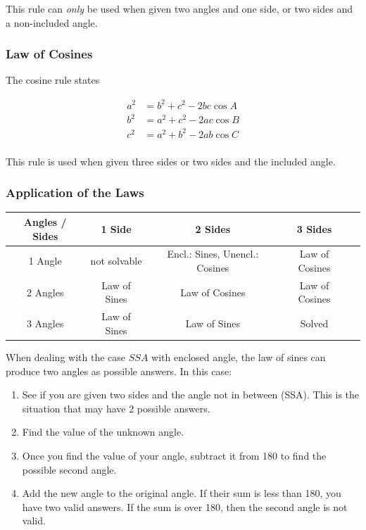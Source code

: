 This rule can \emph{only} be used when given two angles and one side, or two sides and a non-included angle.

\subsubsection{Law of Cosines}

The cosine rule states

\begin{align}
	a^{2} & =b^{2}+c^{2}-2 b c \cos A \\
	b^{2} & =a^{2}+c^{2}-2 a c \cos B \\
	c^{2} & =a^{2}+b^{2}-2 a b \cos C \\
\end{align}

This rule is used when given three sides or two sides and the included angle.
\subsubsection{Application of the Laws}

\begin{table}[ht]
\renewcommand{\arraystretch}{3}
\centering
\begin{tabular}{ccccc}
\toprule
                      Angles / Sides& 1 Side & 2 Sides& 3 Sides \\ \midrule
\multicolumn{1}{c|}{1 Angle} & not solvable & Encl.: Sines, Unencl.: Cosines & Law of Cosines  \\
\multicolumn{1}{c|}{2 Angles} & Law of Sines & Law of Cosines & Law of Cosines &  \\
\multicolumn{1}{c|}{3 Angles} & Law of Sines & Law of Sines & Solved &  \\ \bottomrule
\end{tabular}
\end{table}

When dealing with the case \(SSA\) with enclosed angle, the law of sines can produce two angles as possible answers. In this case:

\begin{enumerate}
	\item See if you are given two sides and the angle not in between (SSA). This is the situation that may have 2 possible answers.
\item  Find the value of the unknown angle.
\item  Once you find the value of your angle, subtract it from 180\degree{} to find the possible second angle.
\item  Add the new angle to the original angle. If their sum is less than 180\degree, you have two valid answers. If the sum is over 180\degree, then the second angle is not valid.
\end{enumerate}


